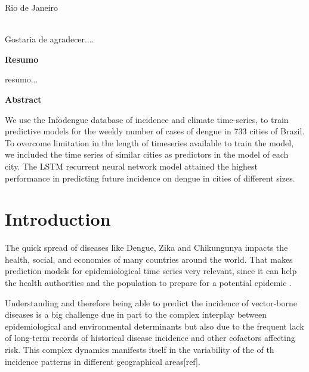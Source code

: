 \documentclass[12pt]{report}
\begin{document}
\par
\vfill
\begin{center}
{{\normalsize Rio de Janeiro}\\
{\normalsize \the\year}}
\end{center}

\thispagestyle{empty}

\newpage
{}\\
\doublespacing
Gostaria de agradecer....

\thispagestyle{empty}

\newpage
\begin{center}
\textbf{\normalsize Resumo}
\end{center}
\vspace{1pt}

resumo...

\thispagestyle{empty}

\newpage
\begin{center}
\textbf{\normalsize Abstract}
\end{center}
\vspace{1pt}

We use the Infodengue database of incidence and climate time-series, to train predictive models for the weekly number of cases of dengue in 733 cities of Brazil. To overcome limitation in the length of timeseries available to train the model, we included the time series of similar cities as predictors in the model of each city. The LSTM recurrent neural network model attained the highest performance in predicting future incidence on dengue in cities of different sizes. 

\thispagestyle{empty}

\newpage
\tableofcontents
\listoffigures
\thispagestyle{empty}

\newpage
\chapter{Introduction}


The quick spread of diseases like Dengue, Zika and Chikungunya impacts the health, social, and economies of many countries around the world. That makes prediction models for epidemiological time series very relevant, since it can help the health authorities and the population to prepare for a potential epidemic \citep{luz2008time}. 


Understanding and therefore being able to predict the incidence of vector-borne diseases is a big challenge due in part to the complex interplay between epidemiological and environmental determinants but also due to the frequent lack of long-term records of historical disease incidence and other cofactors affecting risk. This complex dynamics manifests itself in the variability of the of th incidence patterns in different geographical areas[ref].
\end{document}
